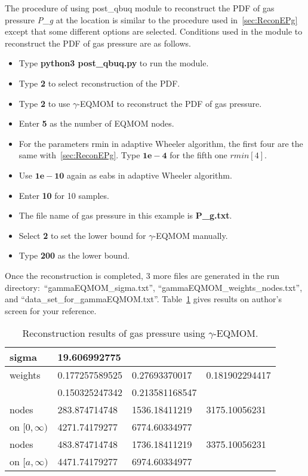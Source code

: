 \documentclass[a4paper,12pt,titlepage]{article}
\begin{document}
The procedure of using post\_qbuq module to reconstruct the PDF of gas pressure
\emph{P\_g} at the location is similar to the procedure used 
in~\ref{sec:ReconEPg} except that some different options are selected.
Conditions used in the module to reconstruct the PDF of gas pressure are as
follows. 

\begin{itemize}
 \item Type \textbf{python3 post\_qbuq.py} to run the module.
 \item Type \textbf{2} to select reconstruction of the PDF.
 \item Type \textbf{2} to use $\gamma$-EQMOM to reconstruct the PDF of gas 
 pressure.
 \item Enter \textbf{5} as the number of EQMOM nodes.
 \item For the parameters rmin in adaptive Wheeler algorithm, the first four are 
 the same with~\ref{sec:ReconEPg}. Type $\mathbf{1e-4}$ for the fifth one 
 $rmin[4]$.
 \item Use $\mathbf{1e-10}$ again as eabs in adaptive Wheeler algorithm.
 \item Enter \textbf{10} for 10 samples.
 \item The file name of gas pressure in this example is \textbf{P\_g.txt}.
 \item Select \textbf{2} to set the lower bound for $\gamma$-EQMOM manually.
 \item Type \textbf{200} as the lower bound.
\end{itemize}

Once the reconstruction is completed, 3 more files are generated in the run
directory:\ ``gammaEQMOM\_sigma.txt'', ``gammaEQMOM\_weights\_nodes.txt'', and
``data\_set\_for\_gammaEQMOM.txt''. Table~\ref{tab:ReconPg} gives results on 
author's screen for your reference.

\begin{table}[htp]
 \centering
 \begin{tabular}{l|lll} \hline
  sigma            & \multicolumn{3}{l}{19.606992775}                 \\ \hline
  weights          & 0.177257589525 & 0.27693370017  & 0.181902294417 \\ 
                   & 0.150325247342 & 0.213581168547 &                \\ \hline
  nodes            & 283.874714748  & 1536.18411219  & 3175.10056231  \\
  on $[0, \infty)$ & 4271.74179277  & 6774.60334977  &                \\ \hline
  nodes            & 483.874714748  & 1736.18411219  & 3375.10056231  \\ 
  on $[a, \infty)$ & 4471.74179277  & 6974.60334977  &                \\ \hline
 \end{tabular}
 \caption{Reconstruction results of gas pressure using $\gamma$-EQMOM.}
 \label{tab:ReconPg}
\end{table}
\end{document}
